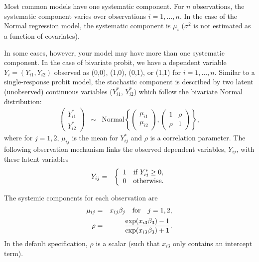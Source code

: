 Most common models have one systematic component.  For $n$
observations, the systematic component varies over observations $i = 1,
\dots, n$.  In the case of the Normal regression model, the systematic
component is $\mu_i$ ($\sigma^2$ is not estimated as a function of
covariates).

In some cases, however, your model may have more than one systematic
component.  In the case of bivariate probit, we have a dependent
variable $Y_i = (Y_{i1}, Y_{i2})$ observed as (0,0), (1,0), (0,1), or
(1,1) for $i = 1, \dots, n$.  Similar to a single-response probit model,
the stochastic component is described by two latent (unobserved)
continuous variables ($Y_{i1}^*$, $Y_{i2}^*$) which follow the
bivariate Normal distribution:
\begin{eqnarray*}
  \left ( \begin{array}{c} 
      Y_{i1}^* \\
      Y_{i2}^* 
    \end{array}
  \right ) &\sim &  
  \textrm{Normal} \left \{ \left ( 
      \begin{array}{c}
        \mu_{i1} \\ \mu_{i2}
      \end{array} \right ), \left( \begin{array}{cc}
                 1 & \rho \\
                 \rho & 1 
                 \end{array} \right) \right\},
\end{eqnarray*}
where for $j = 1, 2$, $\mu_{ij}$ is the mean for $Y_{ij}^*$ and $\rho$ is a
correlation parameter. The following observation mechanism links the
observed dependent variables, $Y_{ij}$, with these latent variables
\begin{eqnarray*}
Y_{ij} & = & \left \{ \begin{array}{cc}
                   1 & {\rm if} \; Y_{ij}^* \ge 0, \\
                   0 & {\rm otherwise.}
                   \end{array} 
                   \right.
\end{eqnarray*}

The systemic components for each observation are 
  \begin{eqnarray*}
    \mu_{ij} & = & x_{ij} \beta_j \quad {\rm for} \quad j = 1, 2, \\
    \rho & = & \frac{\exp(x_{i3} \beta_3) - 1}{\exp(x_{i3} \beta_3) + 1}.
\end{eqnarray*}
In the default specification, $\rho$ is a scalar
(such that $x_{i3}$ only contains an intercept term).  

